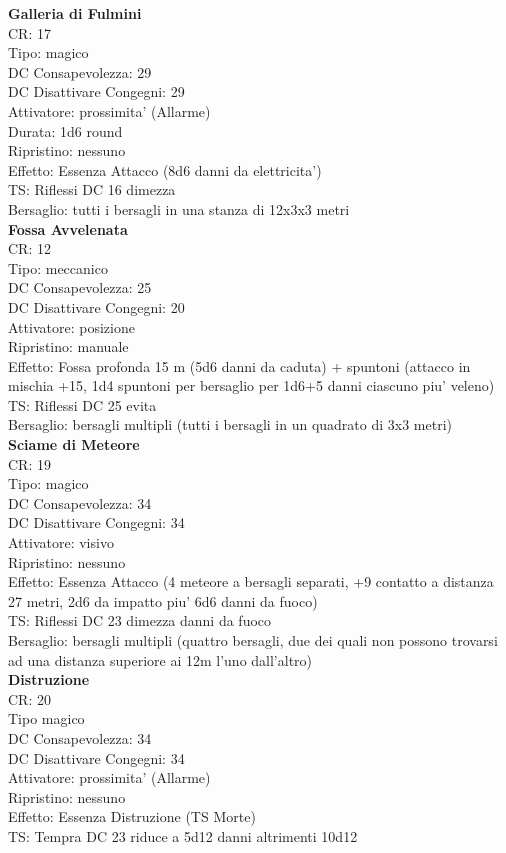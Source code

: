 \documentclass[a4paper,11pt,twoside,openany]{book}
\begin{document}
\begin{multicols}{2}
\textbf{Galleria di Fulmini}\\
CR: 17 \\
Tipo: magico \\
DC Consapevolezza: 29 \\
DC Disattivare Congegni: 29 \\
Attivatore: prossimita' (Allarme) \\
Durata: 1d6 round \\
Ripristino: nessuno \\
Effetto: Essenza Attacco (8d6 danni da elettricita') \\
TS: Riflessi DC 16 dimezza \\
Bersaglio: tutti i bersagli in una stanza di 12x3x3 metri\\

\textbf{Fossa Avvelenata}\\
CR: 12 \\
Tipo: meccanico \\
DC Consapevolezza: 25 \\
DC Disattivare Congegni: 20 \\
Attivatore: posizione \\
Ripristino: manuale \\
Effetto: Fossa profonda 15 m (5d6 danni da caduta) + spuntoni (attacco in mischia +15, 1d4 spuntoni per bersaglio per 1d6+5 danni ciascuno piu' veleno)\\
TS: Riflessi DC 25 evita \\
Bersaglio: bersagli multipli (tutti i bersagli in un quadrato di 3x3 metri)\\

\textbf{Sciame di Meteore}\\
CR: 19 \\
Tipo: magico \\
DC Consapevolezza: 34 \\
DC Disattivare Congegni: 34 \\
Attivatore: visivo\\
Ripristino: nessuno \\
Effetto: Essenza Attacco (4 meteore a bersagli separati, +9 contatto a distanza 27 metri, 2d6 da impatto piu' 6d6 danni da fuoco)\\
TS: Riflessi DC 23 dimezza danni da fuoco\\
Bersaglio: bersagli multipli (quattro bersagli, due dei quali non possono trovarsi ad una distanza superiore ai 12m l’uno dall’altro)\\

\textbf{Distruzione}\\
CR: 20 \\
Tipo magico \\
DC Consapevolezza: 34 \\
DC Disattivare Congegni: 34 \\
Attivatore: prossimita' (Allarme) \\
Ripristino: nessuno \\
Effetto: Essenza Distruzione (TS Morte)\\
TS: Tempra DC 23 riduce a 5d12 danni altrimenti 10d12\\

\end{multicols}
\end{document}
